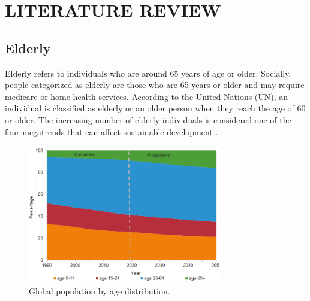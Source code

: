 \chapter{LITERATURE REVIEW}


\section{Elderly}
Elderly refers to individuals who are around 65 years of age or older. Socially, people categorized as elderly are those who are 65 years or older and may require medicare or home health services. According to the United Nations (UN), an individual is classified as elderly or an older person when they reach the age of 60 or older. The increasing number of elderly individuals is considered one of the four megatrends that can affect sustainable development \cite{nations2019world}.


\begin{figure}[H]
    \centering
    \includegraphics[width=0.75\textwidth]{bab2/ar_PopulationbyAge.png}
    \caption{Global population by age distribution.}
    \label{fig:PopulationbyAge}
\end{figure}

